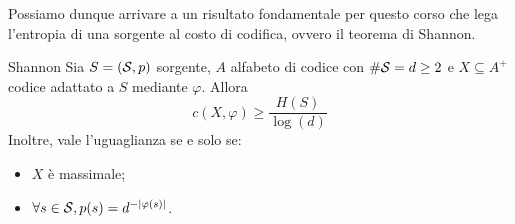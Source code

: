 Possiamo dunque arrivare a un risultato fondamentale per questo corso che lega l'entropia di una sorgente al costo di codifica, ovvero il teorema di Shannon.

\begin{theorem}{Shannon}
  Sia \(S = (\mathcal{S},p)\) sorgente, \(A\) alfabeto di codice con \(\#\mathcal{S} = d \geq 2\) e \(X \subseteq A^+\) codice adattato a \(S\) mediante \(\varphi\).
  Allora
  \[c(X,\varphi) \geq \frac{H(S)}{\log\left(d\right)}\]
  Inoltre, vale l'uguaglianza se e solo se:
  \begin{itemize}
    \item \(X\) è massimale;
    \item \(\forall s\in \mathcal{S}, p(s) = d^{-\left|\varphi(s)\right|}\).
  \end{itemize}
\end{theorem}
